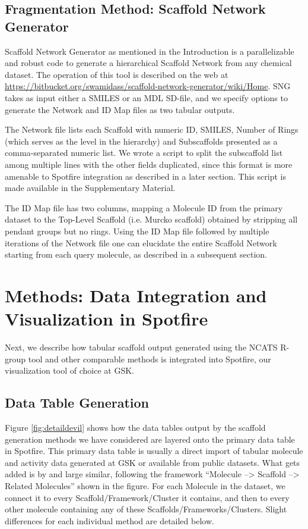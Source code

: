 \documentclass[journal=jacsat,manuscript=article]{achemso}
\newcommand*\fref[1]{Figure \ref{fig:#1}}
\begin{document}
\subsection{Fragmentation Method: Scaffold Network Generator}
\label{sec:SNG}
Scaffold Network Generator \cite{Matlock2013SNG} as mentioned in the Introduction is a parallelizable and robust code to generate a hierarchical Scaffold Network from any chemical dataset. The operation of this tool is described on the web at \url{https://bitbucket.org/swamidass/scaffold-network-generator/wiki/Home}. SNG takes as input either a SMILES or an MDL SD-file, and we specify options to generate the Network and ID Map files as two tabular outputs. 

The Network file lists each Scaffold with numeric ID, SMILES, Number of Rings (which serves as the level in the hierarchy) and Subscaffolds presented as a comma-separated numeric list. We wrote a script to split the subscaffold list among multiple lines with the other fields duplicated, since this format is more amenable to Spotfire integration as described in a later section.  This script is made available in the Supplementary Material.    

The ID Map file has two columns, mapping a Molecule ID from the primary dataset to the Top-Level Scaffold (i.e. Murcko scaffold) obtained by stripping all pendant groups but no rings. Using the ID Map file followed by multiple iterations of the Network file one can elucidate the entire Scaffold Network starting from each query molecule, as described in a subsequent section.

\section{Methods: Data Integration and Visualization in Spotfire}
\label{sec:methods2}

Next, we describe how tabular scaffold output generated using the NCATS R-group tool and other comparable methods is integrated into Spotfire, our visualization tool of choice at GSK.

\subsection{Data Table Generation}

\fref{detaildevil} shows how the data tables output by the scaffold generation methods we have considered are layered onto the primary data table in Spotfire. This primary data table is usually a direct import of tabular molecule and activity data generated at GSK or available from public datasets. What gets added is by and large similar, following the framework ``Molecule --> Scaffold --> Related Molecules'' shown in the figure. For each Molecule in the dataset, we connect it to every Scaffold/Framework/Cluster it contains, and then to every other molecule containing any of these Scaffolds/Frameworks/Clusters. Slight differences for each individual method are detailed below. 
\end{document}
